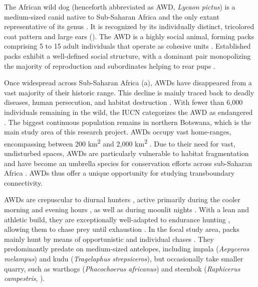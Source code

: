 \documentclass[../FinalThesis.tex]{subfiles}
\begin{document}
The African wild dog (henceforth abbreviated as AWD, \textit{Lycaon pictus}) is
a medium-sized canid native to Sub-Saharan Africa and the only extant
representative of its genus \citep{Kingdon.2015}. It is recognized by its
individually distinct, tricolored coat pattern and large ears ().
The AWD is a highly social animal, forming packs comprising 5 to 15 adult
individuals that operate as cohesive units \citep{Kuhme.1965, Frame.1979}.
Established packs exhibit a well-defined social structure, with a dominant pair
monopolizing the majority of reproduction and subordinates helping to rear pups
\citep{Frame.1979}.

Once widespread across Sub-Saharan Africa (a), AWDs have
disappeared from a vast majority of their historic range. This decline is mainly
traced back to deadly diseases, human persecution, and habitat destruction
\citep{Fanshawe.1991, Woodroffe.2020}. With fewer than 6,000 individuals
remaining in the wild, the IUCN categorizes the AWD as endangered
\citep{Woodroffe.2020}. The biggest continuous population remains in northern
Botswana, which is the main study area of this research project. AWDs occupy
vast home-ranges, encompassing between 200 km\textsuperscript{2} and 2,000
km\textsuperscript{2} \citep{Pomilia.2015}. Due to their need for vast,
undisturbed spaces, AWDs are particularly vulnerable to habitat fragmentation
and have become an umbrella species for conservation efforts across sub-Saharan
Africa \citep{Dalerum.2008, Brennan.2020}. AWDs thus offer a unique opportunity
for studying transboundary connectivity.

AWDs are crepuscular to diurnal hunters \citep{Saleni.2007}, active primarily
during the cooler morning and evening hours \citep{Kuhme.1965, Creel.2001}, as
well as during moonlit nights \citep{Estes.1967, Saleni.2007, Cozzi.2012}. With
a lean and athletic build, they are exceptionally well-adapted to endurance
hunting \citep{Taylor.1971, Estes.1967, Koshy.2020, Smith.2020}, allowing them
to chase prey until exhaustion \citep{Estes.1967, Creel.1995, Rhodes.2004}. In
the focal study area, packs mainly hunt by means of opportunistic and individual
chases \citep{Hubel.2016}. They predominantly predate on medium-sized antelopes,
including impala (\textit{Aepyceros melampus}) and kudu (\textit{Tragelaphus
strepsiceros}), but occasionally take smaller quarry, such as warthogs
(\textit{Phacochoerus africanus}) and steenbok (\textit{Raphicerus campestris},
\citealp{Creel.1995, Mills.1997, Hayward.2006, Tshimologo.2021}).
\end{document}
